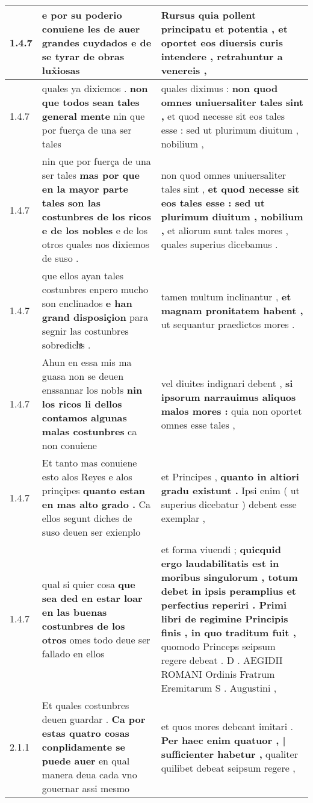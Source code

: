 \begin{tabular}{|p{1cm}|p{6.5cm}|p{6.5cm}|}
1.4.7 & e por su poderio \textbf{ conuiene les de auer grandes cuydados } e de se tyrar de obras lux̉iosas & Rursus quia pollent principatu et potentia , \textbf{ et oportet eos diuersis curis intendere , } retrahuntur a venereis , \\\hline
1.4.7 & quales ya dixiemos . \textbf{ non que todos sean tales general mente } nin que por fuerça de una ser tales & quales diximus : \textbf{ non quod omnes uniuersaliter tales sint , } et quod necesse sit eos tales esse : sed ut plurimum diuitum , nobilium , \\\hline
1.4.7 & nin que por fuerça de una ser tales \textbf{ mas por que en la mayor parte tales son las costunbres de los ricos e de los nobles } e de los otros quales nos dixiemos de suso . & non quod omnes uniuersaliter tales sint , \textbf{ et quod necesse sit eos tales esse : sed ut plurimum diuitum , nobilium , } et aliorum sunt tales mores , quales superius dicebamus . \\\hline
1.4.7 & que ellos ayan tales costunbres enpero mucho son enclinados \textbf{ e han grand disposiçion } para segnir las costunbres sobredichͣs . & tamen multum inclinantur , \textbf{ et magnam pronitatem habent , } ut sequantur praedictos mores . \\\hline
1.4.7 & Ahun en essa mis ma guasa non se deuen enssannar los nobłs \textbf{ nin los ricos li dellos contamos algunas malas costunbres } ca non conuiene & vel diuites indignari debent , \textbf{ si ipsorum narrauimus aliquos malos mores : } quia non oportet omnes esse tales , \\\hline
1.4.7 & Et tanto mas conuiene esto alos Reyes e alos prinçipes \textbf{ quanto estan en mas alto grado . } Ca ellos segunt diches de suso deuen ser exienplo & et Principes , \textbf{ quanto in altiori gradu existunt . } Ipsi enim ( ut superius dicebatur ) debent esse exemplar , \\\hline
1.4.7 & qual si quier cosa \textbf{ que sea ded en estar loar en las buenas costunbres de los otros } omes todo deue ser fallado en ellos & et forma viuendi ; \textbf{ quicquid ergo laudabilitatis est in moribus singulorum , totum debet in ipsis peramplius et perfectius reperiri . Primi libri de regimine Principis finis , in quo traditum fuit , } quomodo Princeps seipsum regere debeat . D . AEGIDII ROMANI Ordinis Fratrum Eremitarum S . Augustini , \\\hline
2.1.1 & Et quales costunbres deuen guardar . \textbf{ Ca por estas quatro cosas conplidamente se puede auer } en qual manera deua cada vno gouernar assi mesmo & et quos mores debeant imitari . \textbf{ Per haec enim quatuor , | sufficienter habetur , } qualiter quilibet debeat seipsum regere , \\\hline

\end{tabular}
